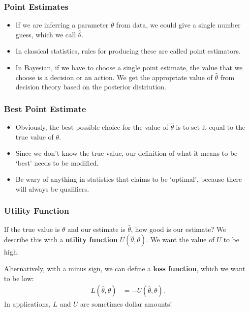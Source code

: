 \documentclass{beamer}
\begin{document}
\begin{frame}
\frametitle{Point Estimates}

\begin{itemize}
\item If we are inferring a parameter $\theta$ from data, we could
give a single number guess, which we call $\hat{\theta}$. \pause
\item In classical statistics, rules for producing these are called point
estimators. \pause
\item  In Bayesian, if we have to choose a single point estimate,
the value that we choose is a decision or an action. We
get the appropriate value of $\hat{\theta}$
from decision theory based on the posterior
distriution.
\end{itemize}

\end{frame}

\begin{frame}
\frametitle{Best Point Estimate}
\begin{itemize}
\item Obviously, the best possible choice for the value of $\hat{\theta}$ is to
set it equal to the true value of $\theta$.\pause
\item Since we don't know the true value, our definition of what it means to
be `best' needs to be modified.\pause
\item Be wary of anything in statistics that claims to be `optimal', because
there will always be qualifiers.
\end{itemize}
\end{frame}


\begin{frame}
\frametitle{Utility Function}
If the true value is $\theta$ and our estimate is $\hat{\theta}$, how good is
our estimate? We describe this with a {\bf utility function} $U(\hat{\theta}, \theta)$.
We want the value of $U$ to be high. \pause

Alternatively, with a minus sign, we can
define a {\bf loss function}, which we want to be low:
\begin{align}
L(\hat{\theta}, \theta) &= -U(\hat{\theta}, \theta).
\end{align}
\pause
In applications, $L$ and $U$ are sometimes dollar amounts!

\end{frame}
\end{document}
